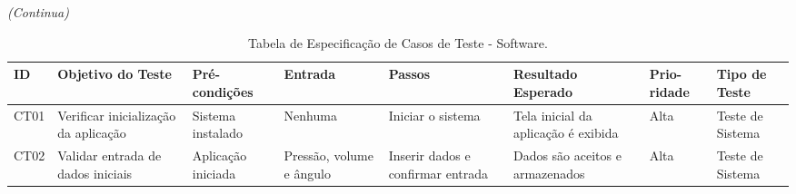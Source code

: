 \begin{table}[H]
    \caption{Tabela de Especificação de Casos de Teste - Software.}
    \label{tab:casos_de_teste}
    \hfill\textit{(Continua)}
    
    \centering
    \renewcommand{\theadfont}{\bfseries}
    \begin{tabular}{|p{0.8cm}|p{1.8cm}|p{1.8cm}|p{1.8cm}|p{2.3cm}|p{2.5cm}|p{1.1cm}|p{1.7cm}|}
    \hline
    \textbf{ID} & \textbf{Objetivo do Teste} & \textbf{Pré-condições} & \textbf{Entrada} & \textbf{Passos} & \textbf{Resultado Esperado} & \textbf{Prio-ridade } & \textbf{Tipo de Teste} \\
    \hline
    CT01  & Verificar inicialização da aplicação & Sistema instalado & Nenhuma & Iniciar o sistema & Tela inicial da aplicação é exibida & Alta & Teste de Sistema \\
    \hline
    CT02  & Validar entrada de dados iniciais & Aplicação iniciada & Pressão, volume e ângulo & Inserir dados e confirmar entrada & Dados são aceitos e armazenados & Alta & Teste de Sistema \\
    \hline
    \end{tabular}
\end{table}

